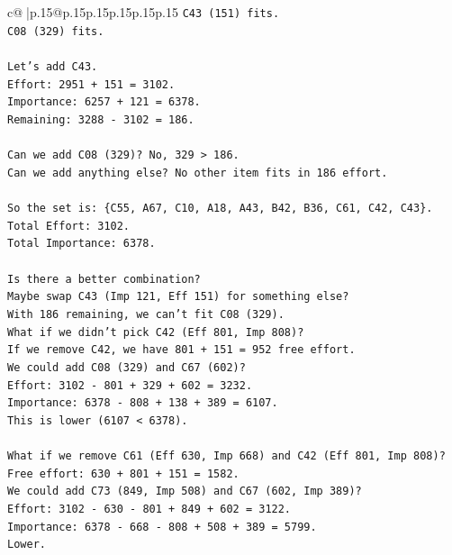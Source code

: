 \documentclass{article}
\begin{document}
{\begin{supertabular}{c@{$\;$}|p{.15\linewidth}@{}p{.15\linewidth}p{.15\linewidth}p{.15\linewidth}p{.15\linewidth}p{.15\linewidth}}
{{{\texttt{C43 (151) fits.} \\
\texttt{C08 (329) fits.} \\
\\ 
\texttt{Let's add C43.} \\
\texttt{Effort: 2951 + 151 = 3102.} \\
\texttt{Importance: 6257 + 121 = 6378.} \\
\texttt{Remaining: 3288 {-} 3102 = 186.} \\
\\ 
\texttt{Can we add C08 (329)? No, 329 > 186.} \\
\texttt{Can we add anything else? No other item fits in 186 effort.} \\
\\ 
\texttt{So the set is: \{C55, A67, C10, A18, A43, B42, B36, C61, C42, C43\}.} \\
\texttt{Total Effort: 3102.} \\
\texttt{Total Importance: 6378.} \\
\\ 
\texttt{Is there a better combination?} \\
\texttt{Maybe swap C43 (Imp 121, Eff 151) for something else?} \\
\texttt{With 186 remaining, we can't fit C08 (329).} \\
\texttt{What if we didn't pick C42 (Eff 801, Imp 808)?} \\
\texttt{If we remove C42, we have 801 + 151 = 952 free effort.} \\
\texttt{We could add C08 (329) and C67 (602)?} \\
\texttt{Effort: 3102 {-} 801 + 329 + 602 = 3232.} \\
\texttt{Importance: 6378 {-} 808 + 138 + 389 = 6107.} \\
\texttt{This is lower (6107 < 6378).} \\
\\ 
\texttt{What if we remove C61 (Eff 630, Imp 668) and C42 (Eff 801, Imp 808)?} \\
\texttt{Free effort: 630 + 801 + 151 = 1582.} \\
\texttt{We could add C73 (849, Imp 508) and C67 (602, Imp 389)?} \\
\texttt{Effort: 3102 {-} 630 {-} 801 + 849 + 602 = 3122.} \\
\texttt{Importance: 6378 {-} 668 {-} 808 + 508 + 389 = 5799.} \\
\texttt{Lower.} \\
\\ 
}}}
\end{supertabular}}
\end{document}

